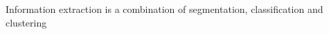 %
%
%






Information extraction is a combination of segmentation, classification and clustering 





















































































































